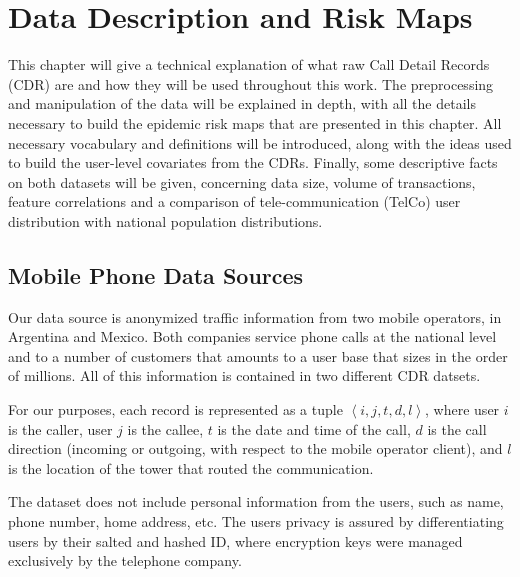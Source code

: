 

\chapter{Data Description and Risk Maps}\label{ch:descr-risk}

This chapter will give a technical explanation of what raw Call Detail Records (CDR) are and how they will be used throughout this work.
The preprocessing and manipulation of the data will be explained in depth, with all the details necessary to build the epidemic risk maps that are presented in this chapter.
All necessary vocabulary and definitions will be introduced, along with the ideas used to build the user-level covariates from the CDRs.
Finally, some descriptive facts on both datasets will be given, concerning data size, volume of transactions, feature correlations and a comparison of tele-communication (TelCo) user distribution with national population distributions.


\section{Mobile Phone Data Sources}

Our data source is anonymized traffic information from two mobile operators, in Argentina and Mexico.
Both companies service phone calls at the national level and to a number of customers that amounts to a user base that sizes in the order of millions.
All of this information is contained in two different CDR datsets.

For our purposes, each record is represented as a tuple $\left < i, j, t, d, l \right >$, where user $i$ is the caller, user $j$ is the callee, $t$ is the date and time of the call, $d$ is the call direction (incoming or outgoing, with respect to the mobile operator client), and $l$ is the location of the tower that routed the communication.

The dataset does not include personal information from the users, such as name, phone number, home address, etc.
The users privacy is assured by differentiating users by their salted and hashed ID, where encryption keys were managed exclusively by the telephone company.

